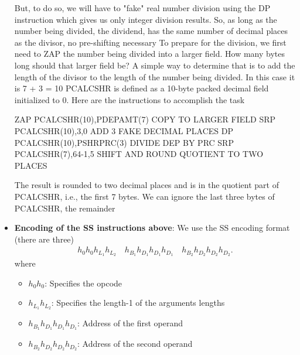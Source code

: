 \documentclass{report}
\begin{document}
\begin{itemize}
            \bigbreak \noindent 
            But, to do so, we will have to "fake" real number division using the DP instruction which gives us only integer division results.
            \bigbreak \noindent 
            So, as long as the number being divided, the dividend, has the same number of decimal places as the divisor, no pre-shifting necessary
            \bigbreak \noindent 
            To prepare for the division, we first need to ZAP the number being divided into a larger field.
            \bigbreak \noindent 
            How many bytes long should that larger field be? A simple way to determine that is to add the length of the divisor to the length of the number being divided. In this case it is 7 + 3 = 10
            \bigbreak \noindent 
            PCALCSHR is defined as a 10-byte packed decimal field initialized to 0.
            \bigbreak \noindent 
            Here are the instructions to accomplish the task
            \bigbreak \noindent 
            \begin{cppcode}
                ZAP PCALCSHR(10),PDEPAMT(7) COPY TO LARGER FIELD
                SRP PCALCSHR(10),3,0 ADD 3 FAKE DECIMAL PLACES
                DP PCALCSHR(10),PSHRPRC(3) DIVIDE DEP BY PRC
                SRP PCALCSHR(7),64-1,5 SHIFT AND ROUND QUOTIENT TO TWO PLACES
            \end{cppcode}
            \bigbreak \noindent 
            The result is rounded to two decimal places and is in the quotient part of PCALCSHR, i.e., the first 7 bytes. We can ignore the last three bytes of PCALCSHR, the remainder
        \item \textbf{Encoding of the SS instructions above}: We use the SS encoding format (there are three)
            \begin{align*}
                h_{0}h_{0}h_{L_{1}}h_{L_{2}} \quad h_{B_{1}}h_{D_{1}}h_{D_{1}}h_{D_{1}} \quad h_{B_{2}}h_{D_{2}}h_{D_{2}}h_{D_{2}}
            .\end{align*}
            where 
            \begin{itemize}
                \item \textbf{$h_{0}h_{0}$}: Specifies the opcode
                \item \textbf{$h_{L_{1}}h_{L_{2}}$}: Specifies the length-1 of the arguments lengths
                \item \textbf{$h_{B_{1}}h_{D_{1}}h_{D_{1}}h_{D_{1}} $}: Address of the first operand
                \item \textbf{$h_{B_{2}}h_{D_{2}}h_{D_{2}}h_{D_{2}} $}: Address of the second operand

\end{itemize}
\end{itemize}
\end{document}
